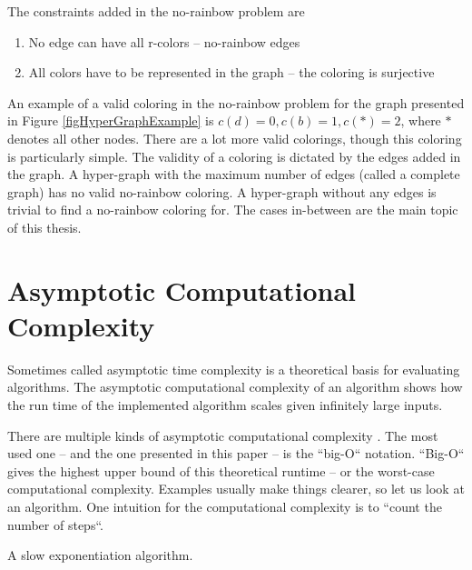 \documentclass[msc,lith,english]{liuthesis}
\begin{document}
The constraints added in the no-rainbow problem are \cite{sourceNoRainbow}
\begin{enumerate}
  \item No edge can have all r-colors -- no-rainbow edges
  \item All colors have to be represented in the graph -- the coloring is surjective
\end{enumerate}

An example of a valid coloring in the no-rainbow problem for the graph presented in Figure \ref{figHyperGraphExample} is $c(d)=0, c(b)=1, c(*)=2$, where $*$ denotes all other nodes.
There are a lot more valid colorings, though this coloring is particularly simple.
The validity of a coloring is dictated by the edges added in the graph.
A hyper-graph with the maximum number of edges (called a complete graph) has no valid no-rainbow coloring.
A hyper-graph without any edges is trivial to find a no-rainbow coloring for.
The cases in-between are the main topic of this thesis.


\section{Asymptotic Computational Complexity}
Sometimes called asymptotic time complexity is a theoretical basis for evaluating algorithms.
The asymptotic computational complexity of an algorithm shows how the run time
of the implemented algorithm scales given infinitely large inputs.


There are multiple kinds of asymptotic computational complexity \cite[Chapter 3]{sourceAlgoBook}. The most used
one -- and the one presented in this paper -- is the ``big-O`` notation. ``Big-O``
gives the highest upper bound of this theoretical runtime -- or the worst-case
computational complexity. Examples usually make things clearer, so let us look at an algorithm.
One intuition for the computational complexity is to ``count the number of steps``.

\begin{algorithm}
\caption{A slow exponentiation algorithm.}\label{algDivSlow}
\DontPrintSemicolon
{}

\end{algorithm}
\end{document}
